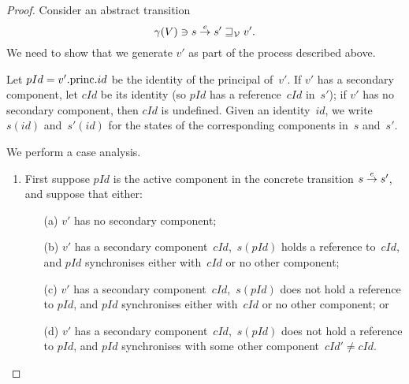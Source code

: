 \begin{proof}
Consider an abstract transition
\[
\gamma(V) \ni s \stackrel{e}\rightarrow s' \sqsupseteq_{\mathcal{V}} v'.
\]
We need to show that we generate $v'$ as part of the process described above.

Let $pId = v'.\mathrm{princ}.id$ be the identity of the principal of~$v'$.  If $v'$
has a secondary component, let $cId$ be its identity (so $pId$ has a
reference~$cId$ in~$s'$); if $v'$ has no secondary component, then $cId$ is
undefined.  Given an identity~$id$, we write $s(id)$ and~$s'(id)$ for the
states of the corresponding components in~$s$ and~$s'$.


We perform a case analysis.
%
\begin{enumerate}
\item
First suppose $pId$ is the active component in the concrete transition \( {s
  \stackrel{e}\rightarrow s'} \), and suppose that either: 
\begin{enumerate}
\item[(a)] $v'$ has no secondary component; 

\item[(b)] $v'$ has a secondary component~$cId$,\, $s(pId)$ holds a reference
  to~$cId$, and $pId$ synchronises either with~$cId$ or no other component;
  
\item[(c)] $v'$ has a secondary component~$cId$,\, $s(pId)$ does not hold a
  reference to $pId$, and $pId$ synchronises either with~$cId$ or no other
  component; or

\item[(d)] $v'$ has a secondary component~$cId$,\, $s(pId)$ does not
  hold a reference to $pId$, and $pId$ synchronises with some other
  component~$cId' \ne cId$.
\end{enumerate}



\end{enumerate}
\end{proof}
